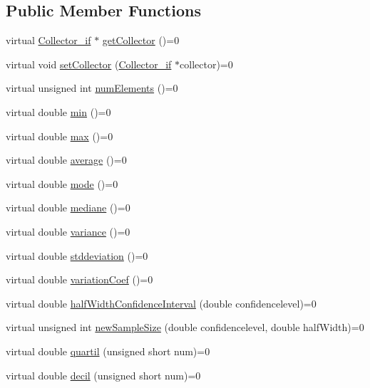 \subsection*{Public Member Functions}
\begin{DoxyCompactItemize}
\item 
virtual \hyperlink{class_collector__if}{Collector\+\_\+if} $\ast$ \hyperlink{class_statistics__if_a49a730541ca9a3d8272f39f4000485c4}{get\+Collector} ()=0
\item 
virtual void \hyperlink{class_statistics__if_a203ffe8e5215e887b716b7810023adc6}{set\+Collector} (\hyperlink{class_collector__if}{Collector\+\_\+if} $\ast$collector)=0
\item 
virtual unsigned int \hyperlink{class_statistics__if_a1e76d98f8a61fe03df9e36194eaa5722}{num\+Elements} ()=0
\item 
virtual double \hyperlink{class_statistics__if_acdeb9880a7362e9105871c7fb3f65db6}{min} ()=0
\item 
virtual double \hyperlink{class_statistics__if_a24e3652122f2ec649b4c7d3accc43da0}{max} ()=0
\item 
virtual double \hyperlink{class_statistics__if_a791ab6bbd166254429a3131bdf6e8dd6}{average} ()=0
\item 
virtual double \hyperlink{class_statistics__if_a43b850db407a9a64ab3e2f4d06eab350}{mode} ()=0
\item 
virtual double \hyperlink{class_statistics__if_a0414c1df9272ca674cba6fc30f027684}{mediane} ()=0
\item 
virtual double \hyperlink{class_statistics__if_a1b563f7e92eda3cf3a8f47f07824b96b}{variance} ()=0
\item 
virtual double \hyperlink{class_statistics__if_a88d2478c6dfd8de19436ab248080a509}{stddeviation} ()=0
\item 
virtual double \hyperlink{class_statistics__if_ae0ad6bf18f8263003b0ac7552318be57}{variation\+Coef} ()=0
\item 
virtual double \hyperlink{class_statistics__if_a093e08a43aefa0738f94ea4f68eaa40d}{half\+Width\+Confidence\+Interval} (double confidencelevel)=0
\item 
virtual unsigned int \hyperlink{class_statistics__if_a041cafef3eb831901296987871f707f0}{new\+Sample\+Size} (double confidencelevel, double half\+Width)=0
\item 
virtual double \hyperlink{class_statistics__if_af85daafcb428420ceeacdd4807c045eb}{quartil} (unsigned short num)=0
\item 
virtual double \hyperlink{class_statistics__if_a562230cad7a31c8af403217743b156f3}{decil} (unsigned short num)=0

\end{DoxyCompactItemize}
